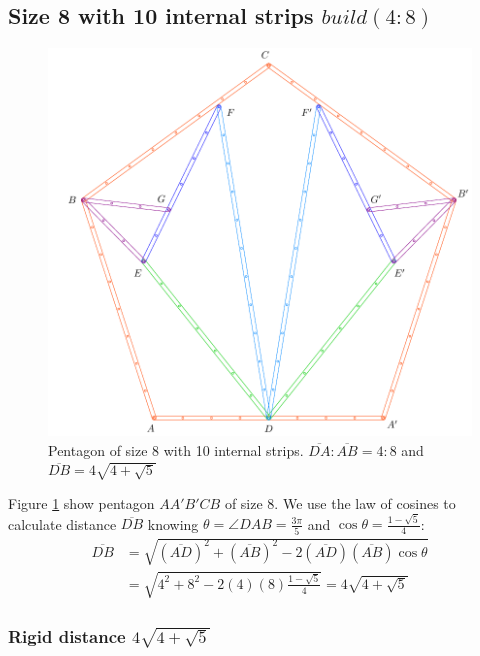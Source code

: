 \documentclass[11pt]{article}
\begin{document}
\subsection{Size 8 with 10 internal strips $build(4:8)$}

\begin{figure}[H]
\centering
\includegraphics[scale=1]{8/penta8-10a}
\caption{Pentagon of size 8 with 10 internal strips. $\overline{DA}:\overline{AB} = 4:8$ and $\overline{DB} = 4\sqrt{4 + \sqrt5}$}
\label{fig:penta8-10a}
\end{figure}

Figure \ref{fig:penta8-10a} show pentagon $AA'B'CB$ of size $8$. We use the law of cosines to calculate distance $\overline{DB}$ knowing $\theta = \angle{DAB} = \frac{3\pi}5$ and $\cos\theta = \frac{1-\sqrt5}4$:
\begin{align}
\overline{DB} &= \sqrt{(\overline{AD})^2 + (\overline{AB})^2
 - 2(\overline{AD})(\overline{AB})\cos\theta} \nonumber\\
 &= \sqrt{4^2 + 8^2 - 2(4)(8)\frac{1-\sqrt5}4} = 4\sqrt{4 + \sqrt5}
\end{align}

\subsubsection{Rigid distance $4\sqrt{4 + \sqrt5}$}
\end{document}
